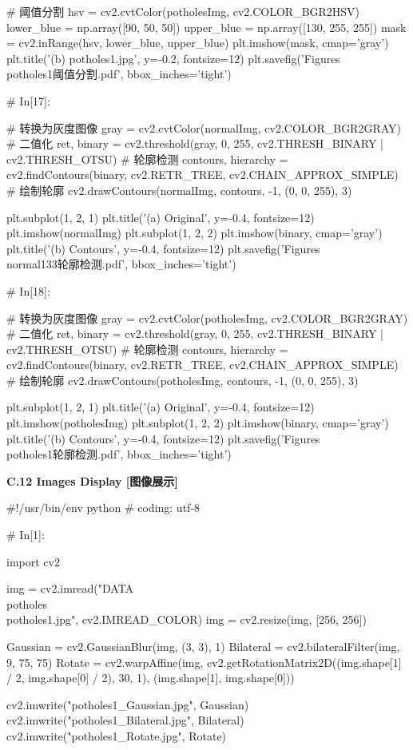 \documentclass{MathorCupmodeling}
\begin{document}
\begin{python}
# 阈值分割
hsv = cv2.cvtColor(potholesImg, cv2.COLOR_BGR2HSV)
lower_blue = np.array([90, 50, 50])
upper_blue = np.array([130, 255, 255])
mask = cv2.inRange(hsv, lower_blue, upper_blue)
plt.imshow(mask, cmap='gray')
plt.title('(b) potholes1.jpg', y=-0.2, fontsize=12)
plt.savefig('Figures\\potholes1阈值分割.pdf', bbox_inches='tight')

# In[17]:


# 转换为灰度图像
gray = cv2.cvtColor(normalImg, cv2.COLOR_BGR2GRAY)
# 二值化
ret, binary = cv2.threshold(gray, 0, 255, cv2.THRESH_BINARY | cv2.THRESH_OTSU)
# 轮廓检测
contours, hierarchy = cv2.findContours(binary, cv2.RETR_TREE, cv2.CHAIN_APPROX_SIMPLE)
# 绘制轮廓
cv2.drawContours(normalImg, contours, -1, (0, 0, 255), 3)

plt.subplot(1, 2, 1)
plt.title('(a) Original', y=-0.4, fontsize=12)
plt.imshow(normalImg)
plt.subplot(1, 2, 2)
plt.imshow(binary, cmap='gray')
plt.title('(b) Contours', y=-0.4, fontsize=12)
plt.savefig('Figures\\normal133轮廓检测.pdf', bbox_inches='tight')

# In[18]:


# 转换为灰度图像
gray = cv2.cvtColor(potholesImg, cv2.COLOR_BGR2GRAY)
# 二值化
ret, binary = cv2.threshold(gray, 0, 255, cv2.THRESH_BINARY | cv2.THRESH_OTSU)
# 轮廓检测
contours, hierarchy = cv2.findContours(binary, cv2.RETR_TREE, cv2.CHAIN_APPROX_SIMPLE)
# 绘制轮廓
cv2.drawContours(potholesImg, contours, -1, (0, 0, 255), 3)

plt.subplot(1, 2, 1)
plt.title('(a) Original', y=-0.4, fontsize=12)
plt.imshow(potholesImg)
plt.subplot(1, 2, 2)
plt.imshow(binary, cmap='gray')
plt.title('(b) Contours', y=-0.4, fontsize=12)
plt.savefig('Figures\\potholes1轮廓检测.pdf', bbox_inches='tight')
\end{python}

\textbf{C.12 Images Display [图像展示]}
\begin{python}
#!/usr/bin/env python
# coding: utf-8

# In[1]:


import cv2

img = cv2.imread("DATA\\potholes\\potholes1.jpg", cv2.IMREAD_COLOR)
img = cv2.resize(img, [256, 256])

Gaussian = cv2.GaussianBlur(img, (3, 3), 1)
Bilateral = cv2.bilateralFilter(img, 9, 75, 75)
Rotate = cv2.warpAffine(img, cv2.getRotationMatrix2D((img.shape[1] / 2, img.shape[0] / 2), 30, 1),
                        (img.shape[1], img.shape[0]))

cv2.imwrite("potholes1_Gaussian.jpg", Gaussian)
cv2.imwrite("potholes1_Bilateral.jpg", Bilateral)
cv2.imwrite("potholes1_Rotate.jpg", Rotate)

\end{python}
\end{document}
